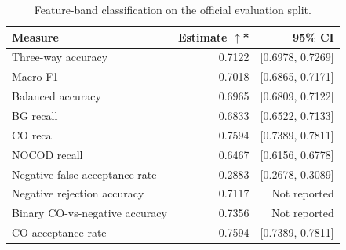 \begin{table}[htbp]
\centering
\caption{Feature-band classification on the official evaluation split.}
\label{tab:classification}
\small
\begin{tabular}{lrr}
\toprule
\textbf{Measure} & \textbf{Estimate $\uparrow$*} & \textbf{95\% CI} \\
\midrule
Three-way accuracy & 0.7122 & [0.6978, 0.7269] \\
Macro-F1 & 0.7018 & [0.6865, 0.7171] \\
Balanced accuracy & 0.6965 & [0.6809, 0.7122] \\
BG recall & 0.6833 & [0.6522, 0.7133] \\
CO recall & 0.7594 & [0.7389, 0.7811] \\
NOCOD recall & 0.6467 & [0.6156, 0.6778] \\
Negative false-acceptance rate & 0.2883 & [0.2678, 0.3089] \\
Negative rejection accuracy & 0.7117 & Not reported \\
Binary CO-vs-negative accuracy & 0.7356 & Not reported \\
CO acceptance rate & 0.7594 & [0.7389, 0.7811] \\
\bottomrule
\end{tabular}

\par{}
\end{table}
